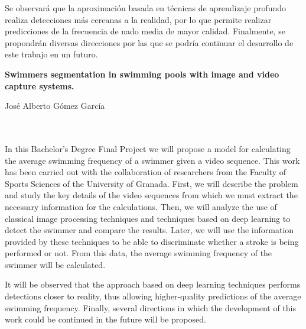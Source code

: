 Se observará que la aproximación basada en técnicas de aprendizaje profundo realiza detecciones más cercanas a la realidad, por lo que permite realizar predicciones de la frecuencia de nado media de mayor calidad. Finalmente, se propondrán diversas direcciones por las que se podría continuar el desarrollo de este trabajo en un futuro.

\clearpage


\thispagestyle{empty}

\begin{center}
{\large\bfseries Swimmers segmentation in swimming pools with image and video capture systems.}\\
\end{center}
\begin{center}
José Alberto Gómez García\\
\end{center}

\\

\vspace{0.7cm}
\\


In this Bachelor's Degree Final Project we will propose a model for calculating the average swimming frequency of a swimmer given a video sequence. This work has been carried out with the collaboration of researchers from the Faculty of Sports Sciences of the University of Granada. First, we will describe the problem and study the key details of the video sequences from which we must extract the necessary information for the calculations. Then, we will analyze the use of classical image processing techniques and techniques based on deep learning to detect the swimmer and compare the results. Later, we will use the information provided by these techniques to be able to discriminate whether a stroke is being performed or not. From this data, the average swimming frequency of the swimmer will be calculated.

It will be observed that the approach based on deep learning techniques performs detections closer to reality, thus allowing higher-quality predictions of the average swimming frequency. Finally, several directions in which the development of this work could be continued in the future will be proposed.


